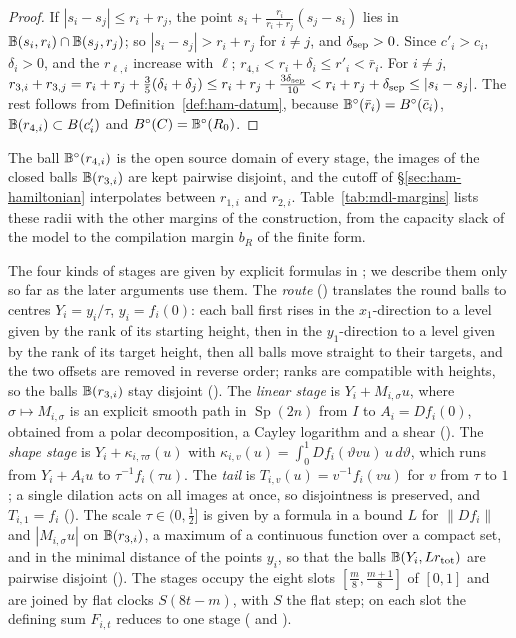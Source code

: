 \begin{proof}
If $|s_i-s_j|\le r_i+r_j$, the point $s_i+\frac{r_i}{r_i+r_j}(s_j-s_i)$ lies in $\mathbb{B}(s_i,r_i)\cap\mathbb{B}(s_j,r_j)$; so
$|s_i-s_j|>r_i+r_j$ for $i\ne j$, and $\delta_{\rm sep}>0$. Since $c'_i>c_i$, $\delta_i>0$, and the $r_{\ell,i}$ increase with $\ell$;
$r_{4,i}<r_i+\delta_i\le r'_i<\bar r_i$. For $i\ne j$,
$r_{3,i}+r_{3,j}=r_i+r_j+\frac35(\delta_i+\delta_j)\le r_i+r_j+\frac{3\delta_{\rm sep}}{10}<r_i+r_j+\delta_{\rm sep}\le|s_i-s_j|$. The rest follows from
Definition~\ref{def:ham-datum}, because $\mathbb{B}^\circ(\bar r_i)=B^{\circ}(\bar c_i)$, $\mathbb{B}(r_{4,i})\subset B(c'_i)$ and $B^{\circ}(C)=\mathbb{B}^\circ(R_0)$.
\end{proof}

The ball $\mathbb{B}^\circ(r_{4,i})$ is the open source domain of every stage, the images of the closed balls $\mathbb{B}(r_{3,i})$ are
kept pairwise disjoint, and the cutoff of \S\ref{sec:ham-hamiltonian} interpolates between $r_{1,i}$ and $r_{2,i}$.
Table~\ref{tab:mdl-margins} lists these radii with the other margins of the construction, from the capacity slack of
the model to the compilation margin $b_R$ of the finite form.

The four kinds of stages are given by explicit formulas in ; we describe them only so far as the
later arguments use them. The \emph{route} () translates the round balls to centres
$Y_i=y_i/\tau$, $y_i=f_i(0)$: each ball first rises in the $x_1$-direction to a level given by the rank of its starting
height, then in the $y_1$-direction to a level given by the rank of its target height, then all balls move straight to
their targets, and the two offsets are removed in reverse order; ranks are compatible with heights, so the balls
$\mathbb{B}(r_{3,i})$ stay disjoint (). The \emph{linear stage} is $Y_i+M_{i,\sigma}u$, where
$\sigma\mapsto M_{i,\sigma}$ is an explicit smooth path in $\operatorname{Sp}(2n)$ from $I$ to $A_i=Df_i(0)$, obtained from a
polar decomposition, a Cayley logarithm and a shear (). The \emph{shape stage} is
$Y_i+\kappa_{i,\tau\sigma}(u)$ with $\kappa_{i,v}(u)=\int_0^1Df_i(\vartheta vu)\,u\,d\vartheta$, which runs from $Y_i+A_iu$ to
$\tau^{-1}f_i(\tau u)$. The \emph{tail} is $T_{i,v}(u)=v^{-1}f_i(vu)$ for $v$ from $\tau$ to $1$; a single dilation acts on all
images at once, so disjointness is preserved, and $T_{i,1}=f_i$ (). The scale $\tau\in(0,\frac12]$ is
given by a formula in a bound $L$ for $\|Df_i\|$ and $|M_{i,\sigma}u|$ on $\mathbb{B}(r_{3,i})$, a maximum of a continuous function over a
compact set, and in the minimal distance of the points $y_i$, so that the balls $\mathbb{B}(Y_i,Lr_{\rm tot})$ are pairwise
disjoint (). The stages occupy the eight slots $[\frac m8,\frac{m+1}8]$ of $[0,1]$ and are
joined by flat clocks $S(8t-m)$, with $S$ the flat step; on each slot the defining sum $F_{i,t}$ reduces to one stage
( and ).

